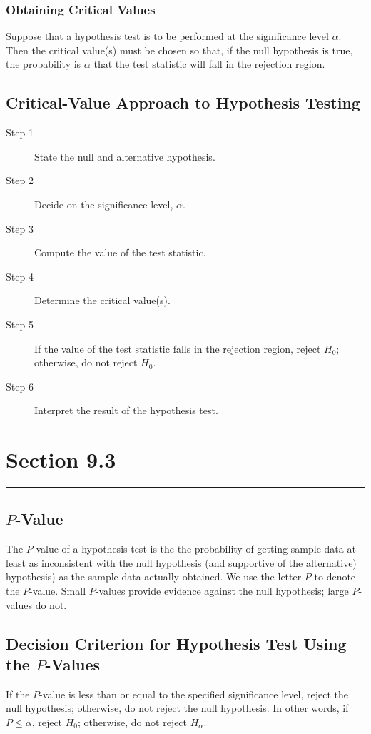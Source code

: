 \documentclass[12pt]{article}
\begin{document}
            \subsubsection*{Obtaining Critical Values}
                Suppose that a hypothesis test is to be performed at the significance level
                $\alpha$. Then the critical value(s) must be chosen so that, if the null
                hypothesis is true, the probability is $\alpha$ that the test statistic will
                fall in the rejection region.
        \subsection*{Critical-Value Approach to Hypothesis Testing}
            \begin{description}
                \item[Step 1] State the null and alternative hypothesis.
                \item[Step 2] Decide on the significance level, $\alpha$.
                \item[Step 3] Compute the value of the test statistic.
                \item[Step 4] Determine the critical value(s).
                \item[Step 5] If the value of the test statistic falls in the rejection
                region, reject $H_0$; otherwise, do not reject $H_0$.
                \item[Step 6] Interpret the result of the hypothesis test.                
            \end{description}

    \section*{Section 9.3}
    \noindent\rule{\textwidth}{0.4pt}
        \subsection*{$P$-Value}
            The $P$-value of a hypothesis test is the the probability of getting sample data
            at least as inconsistent with the null hypothesis (and supportive of the 
            alternative) hypothesis) as the sample data actually obtained. We use the letter
            $P$ to denote the $P$-value. Small $P$-values provide evidence against the null
            hypothesis; large $P$-values do not.
        \subsection*{Decision Criterion for Hypothesis Test Using the $P$-Values}
            If the $P$-value is less than or equal to the specified significance level, reject
            the null hypothesis; otherwise, do not reject the null hypothesis. In other words,
            if $P \leq \alpha$, reject $H_0$; otherwise, do not reject $H_\alpha$.
\end{document}
